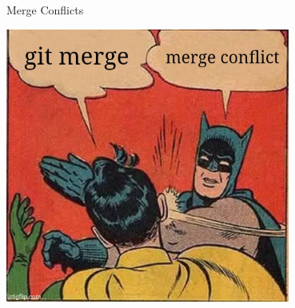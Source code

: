 \documentclass[aspectratio=169]{beamer}
\begin{document}


\begin{frame}{Merge Conflicts}
  \begin{center}
  \includegraphics[width=0.7\textwidth,height=0.9\textheight]{figures/mergeConflict.jpg}
  \end{center}
\end{frame}
\end{document}
